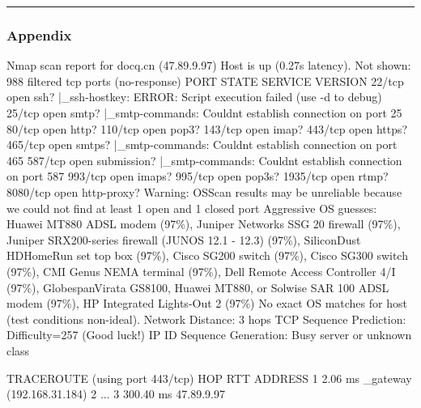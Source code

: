 \documentclass[
]{article}
\newenvironment{Shaded}{}{}
\newcommand{\NormalTok}[1]{#1}
\begin{document}
\begin{center}\rule{0.5\linewidth}{0.5pt}\end{center}

\subsubsection{Appendix}\label{appendix}

\begin{Shaded}
\begin{Highlighting}[]
\NormalTok{Nmap scan report for docq.cn (47.89.9.97)}
\NormalTok{Host is up (0.27s latency).}
\NormalTok{Not shown: 988 filtered tcp ports (no{-}response)}
\NormalTok{PORT     STATE SERVICE     VERSION}
\NormalTok{22/tcp   open  ssh?}
\NormalTok{|\_ssh{-}hostkey: ERROR: Script execution failed (use {-}d to debug)}
\NormalTok{25/tcp   open  smtp?}
\NormalTok{|\_smtp{-}commands: Couldn\textquotesingle{}t establish connection on port 25}
\NormalTok{80/tcp   open  http?}
\NormalTok{110/tcp  open  pop3?}
\NormalTok{143/tcp  open  imap?}
\NormalTok{443/tcp  open  https?}
\NormalTok{465/tcp  open  smtps?}
\NormalTok{|\_smtp{-}commands: Couldn\textquotesingle{}t establish connection on port 465}
\NormalTok{587/tcp  open  submission?}
\NormalTok{|\_smtp{-}commands: Couldn\textquotesingle{}t establish connection on port 587}
\NormalTok{993/tcp  open  imaps?}
\NormalTok{995/tcp  open  pop3s?}
\NormalTok{1935/tcp open  rtmp?}
\NormalTok{8080/tcp open  http{-}proxy?}
\NormalTok{Warning: OSScan results may be unreliable because we could not find at least 1 open and 1 closed port}
\NormalTok{Aggressive OS guesses: Huawei MT880 ADSL modem (97\%), Juniper Networks SSG 20 firewall (97\%), Juniper SRX200{-}series firewall (JUNOS 12.1 {-} 12.3) (97\%), SiliconDust HDHomeRun set top box (97\%), Cisco SG200 switch (97\%), Cisco SG300 switch (97\%), CMI Genus NEMA terminal (97\%), Dell Remote Access Controller 4/I (97\%), GlobespanVirata GS8100, Huawei MT880, or Solwise SAR 100 ADSL modem (97\%), HP Integrated Lights{-}Out 2 (97\%)}
\NormalTok{No exact OS matches for host (test conditions non{-}ideal).}
\NormalTok{Network Distance: 3 hops}
\NormalTok{TCP Sequence Prediction: Difficulty=257 (Good luck!)}
\NormalTok{IP ID Sequence Generation: Busy server or unknown class}

\NormalTok{TRACEROUTE (using port 443/tcp)}
\NormalTok{HOP RTT       ADDRESS}
\NormalTok{1   2.06 ms   \_gateway (192.168.31.184)}
\NormalTok{2   ...}
\NormalTok{3   300.40 ms 47.89.9.97}


\end{Highlighting}
\end{Shaded}
\end{document}
